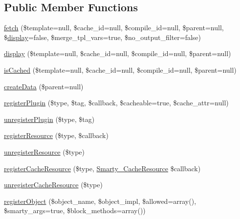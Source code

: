 \subsection*{Public Member Functions}
\begin{DoxyCompactItemize}
\item 
\hyperlink{class_smarty___internal___template_base_a485dfdbc35ffa5d996c8de8b24b4037b}{fetch} (\$template=null, \$cache\+\_\+id=null, \$compile\+\_\+id=null, \$parent=null, \$\hyperlink{class_smarty___internal___template_base_a99bf3ed6256280050eb91485f5ca2c09}{display}=false, \$merge\+\_\+tpl\+\_\+vars=true, \$no\+\_\+output\+\_\+filter=false)
\item 
\hyperlink{class_smarty___internal___template_base_a99bf3ed6256280050eb91485f5ca2c09}{display} (\$template=null, \$cache\+\_\+id=null, \$compile\+\_\+id=null, \$parent=null)
\item 
\hyperlink{class_smarty___internal___template_base_a1e432565b3597a4d6c51c03abf8474e8}{is\+Cached} (\$template=null, \$cache\+\_\+id=null, \$compile\+\_\+id=null, \$parent=null)
\item 
\hyperlink{class_smarty___internal___template_base_afcf9199ce60b62e15a93d4f487f41e8a}{create\+Data} (\$parent=null)
\item 
\hyperlink{class_smarty___internal___template_base_afc5c1f0d058eb1d854dbe9edee757921}{register\+Plugin} (\$type, \$tag, \$callback, \$cacheable=true, \$cache\+\_\+attr=null)
\item 
\hyperlink{class_smarty___internal___template_base_a3fe332f4e80da882f6129ffaa5cd3551}{unregister\+Plugin} (\$type, \$tag)
\item 
\hyperlink{class_smarty___internal___template_base_a2f4c88561b31aa8eb753434b717011c1}{register\+Resource} (\$type, \$callback)
\item 
\hyperlink{class_smarty___internal___template_base_a0c77f4fa6848767f399598ca8cb3d16a}{unregister\+Resource} (\$type)
\item 
\hyperlink{class_smarty___internal___template_base_a2364468b32870d7cefb7adff339a62f4}{register\+Cache\+Resource} (\$type, \hyperlink{class_smarty___cache_resource}{Smarty\+\_\+\+Cache\+Resource} \$callback)
\item 
\hyperlink{class_smarty___internal___template_base_a0df47154a7e37324f5e4f06f0ff5cd02}{unregister\+Cache\+Resource} (\$type)
\item 
\hyperlink{class_smarty___internal___template_base_a62962fde3aa10bf40080ff47abe890f0}{register\+Object} (\$object\+\_\+name, \$object\+\_\+impl, \$allowed=array(), \$smarty\+\_\+args=true, \$block\+\_\+methods=array())

\end{DoxyCompactItemize}
